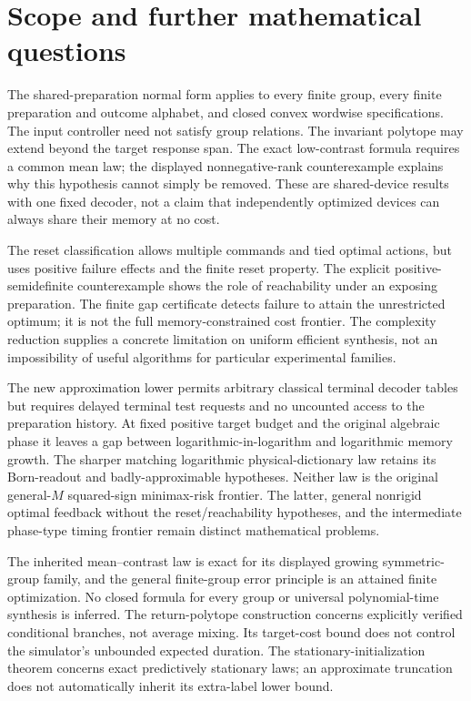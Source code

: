 \section{Scope and further mathematical questions}
\label{sec:r73-scope}\label{sec:r74-scope}\label{sec:r75-scope}\label{sec:r76-scope}\label{sec:r77-scope}
The shared-preparation normal form applies to every finite group, every
finite preparation and outcome alphabet, and closed convex wordwise
specifications.  The input controller need not satisfy group relations.
The invariant polytope may extend beyond the target response span.
The exact low-contrast formula requires a common mean law; the displayed
nonnegative-rank counterexample explains why this hypothesis cannot
simply be removed.  These are shared-device results with one fixed
decoder, not a claim that independently optimized devices can always
share their memory at no cost.

The reset classification allows multiple commands and tied optimal
actions, but uses positive failure effects and the finite reset property.
The explicit positive-semidefinite counterexample shows the role of
reachability under an exposing preparation.  The finite gap certificate
detects failure to attain the unrestricted optimum; it is not the full
memory-constrained cost frontier.  The complexity reduction supplies a
concrete limitation on uniform efficient synthesis, not an impossibility
of useful algorithms for particular experimental families.

The new approximation lower permits arbitrary classical terminal
decoder tables but requires delayed terminal test requests and no
uncounted access to the preparation history.  At fixed positive target
budget and the original algebraic phase it leaves a gap between
logarithmic-in-logarithm and logarithmic memory growth.  The sharper
matching logarithmic physical-dictionary law retains its Born-readout
and badly-approximable hypotheses.  Neither law is the original
general-$M$ squared-sign minimax-risk frontier.  The latter, general
nonrigid optimal feedback without the reset/reachability hypotheses,
and the intermediate phase-type timing frontier remain distinct
mathematical problems.

The inherited mean--contrast law is exact for its displayed growing
symmetric-group family, and the general finite-group error principle
is an attained finite optimization.  No closed formula for every group
or universal polynomial-time synthesis is inferred.  The return-polytope
construction concerns explicitly verified conditional branches, not
average mixing.  Its target-cost bound does not control the simulator's
unbounded expected duration.  The stationary-initialization theorem
concerns exact predictively stationary laws; an approximate truncation
does not automatically inherit its extra-label lower bound.

